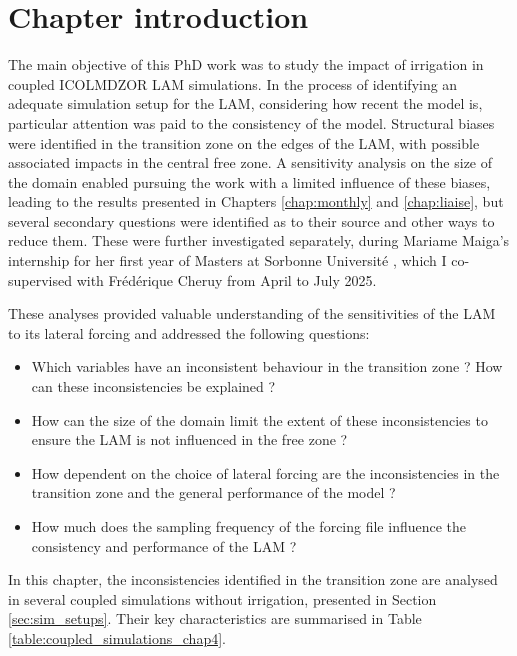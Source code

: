 \section{Chapter introduction}

The main objective of this PhD work was to study the impact of irrigation in coupled ICOLMDZOR LAM simulations.
In the process of identifying an adequate simulation setup for the LAM, considering how recent the model is, particular attention was paid to the consistency of the model. 
Structural biases were identified in the transition zone on the edges of the LAM, with possible associated impacts in the central free zone. 
A sensitivity analysis on the size of the domain enabled pursuing the work with a limited influence of these biases, leading to the results presented in Chapters \ref{chap:monthly} and \ref{chap:liaise}, but several secondary questions were identified as to their source and other ways to reduce them. 
These were further investigated separately, during Mariame Maiga's internship for her first year of Masters at Sorbonne Université \citep{maiga2025}, which I co-supervised with Frédérique Cheruy from April to July 2025. 

These analyses provided valuable understanding of the sensitivities of the LAM to its lateral forcing and addressed the following questions: 
\begin{itemize}
    \item Which variables have an inconsistent behaviour in the transition zone ? How can these inconsistencies be explained ?
    \item How can the size of the domain limit the extent of these inconsistencies to ensure the LAM is not influenced in the free zone ?
    \item How dependent on the choice of lateral forcing are the inconsistencies in the transition zone and the general performance of the model ?
    \item How much does the sampling frequency of the forcing file influence the consistency and performance of the LAM ?
\end{itemize}

\hfill

In this chapter, the inconsistencies identified in the transition zone are analysed in several coupled simulations without irrigation, presented in Section \ref{sec:sim_setups}. Their key characteristics are summarised in Table \ref{table:coupled_simulations_chap4}.


